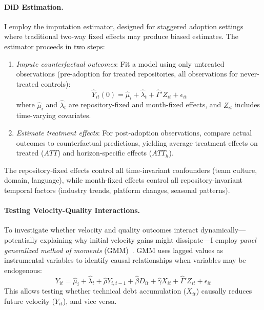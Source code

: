 \paragraph{DiD Estimation.}
I employ the \citet{borusyak2024revisiting} imputation estimator, designed for staggered adoption settings where traditional two-way fixed effects may produce biased estimates.
The estimator proceeds in two steps:
\begin{enumerate}[leftmargin=20pt]
    \item \emph{Impute counterfactual outcomes}: Fit a model using only untreated observations (pre-adoption for treated repositories, all observations for never-treated controls):
    \begin{equation}
    \hat{Y}_{it}(0) = \hat{\mu}_i + \hat{\lambda}_t + \hat{\Gamma}' Z_{it} + \epsilon_{it}
    \end{equation}
    where $\hat{\mu}_i$ and $\hat{\lambda}_t$ are repository-fixed and month-fixed effects, and $Z_{it}$ includes time-varying covariates.
    
    \item \emph{Estimate treatment effects}: For post-adoption observations, compare actual outcomes to counterfactual predictions, yielding average treatment effects on treated ($ATT$) and horizon-specific effects ($ATT_h$).
\end{enumerate}

The repository-fixed effects control all time-invariant confounders (team culture, domain, language), while month-fixed effects control all repository-invariant temporal factors (industry trends, platform changes, seasonal patterns).

\paragraph{Testing Velocity-Quality Interactions.}
To investigate whether velocity and quality outcomes interact dynamically---potentially explaining why initial velocity gains might dissipate---I employ \emph{panel generalized method of moments} (GMM)~\cite{arellano1991some}.
GMM uses lagged values as instrumental variables to identify causal relationships when variables may be endogenous:
\begin{equation}
Y_{it} = \hat\mu_i + \hat\lambda_t + \hat\rho Y_{i,t-1} + \hat\beta D_{it} + \hat\gamma X_{it} + \hat{\Gamma}' Z_{it} +\epsilon_{it}
\end{equation}
This allows testing whether technical debt accumulation ($X_{it}$) causally reduces future velocity ($Y_{it}$), and vice versa.


